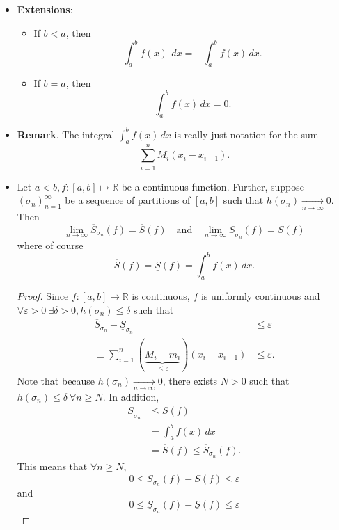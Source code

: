 \documentclass{article}
\newcommand{\R}{\mathbb{R}}
\newcommand{\?}{\stackrel{?}{=}}
\newcommand{\smallblacksquare}{\rule{0.5em}{0.5em}}
\theoremstyle{definition} %
\begin{document}
\begin{itemize}
    \item \textbf{Extensions}: 
    \begin{itemize}[label=\smallblacksquare]
        \item If $b < a$, then
    $$\int_a^b f(x) \ \, dx = -\int_a^b f(x) \, dx.$$
        \item If $b = a$, then
        $$\int_a^b f(x) \, dx = 0.$$
    \end{itemize}
    \item \textbf{Remark}. The integral $\int_a^b f(x) \, dx$ is really just notation for the sum
    $$\sum_{i = 1}^n M_i(x_i - x_{i - 1}).$$
    \item[]
    \begin{lemma}
        Let $a < b, f: [a, b] \mapsto \R$ be a continuous function. Further, suppose $(\sigma_n)_{n = 1}^\infty$ be a sequence of partitions of $[a, b]$ such that $h(\sigma_n) \underset{n \rightarrow \infty}{\longrightarrow} 0$. Then
        $$\lim_{n \to \infty}\overline{S}_{\sigma_n}(f) = \overline{S}(f) \quad \text{and} \quad \lim_{n \to \infty} \underline{S}_{\sigma_n}(f) = \underline{S}(f)$$
        where of course
        $$\overline{S}(f) = \underline{S}(f) = \int_a^b f(x) \, dx.$$
    \end{lemma}
    \begin{proof}
        Since $f: [a, b] \mapsto \R$ is continuous, $f$ is uniformly continuous and $\forall \varepsilon > 0 \ \exists \delta > 0, h(\sigma_n) \leq \delta$ such that
        \begin{align*}
            \overline{S}_{\sigma_n} - \underline{S}_{\sigma_n} &\leq \varepsilon \tag{*} \\
            \equiv \sum_{i = 1}^n (\underbrace{M_i - m_i}_{\leq \varepsilon})(x_i - x_{i - 1}) &\leq \varepsilon.
        \end{align*}
        Note that because $h(\sigma_n) \underset{n \rightarrow \infty}{\longrightarrow} 0$, there exists $N > 0$ such that $h(\sigma_n) \leq \delta \ \forall n \geq N$. In addition,
        \begin{align*}
            \underline{S}_{\sigma_n} &\leq \underline{S}(f) \\
            &= \int_a^b f(x) \, dx \\
            &= \overline{S}(f) \leq \overline{S}_{\sigma_n}(f).
        \end{align*}
        This means that $\forall n \geq N$,
        $$0 \leq \overline{S}_{\sigma_n}(f) - \overline{S}(f) \leq \varepsilon$$
        and
        $$0 \leq \underline{S}_{\sigma_n}(f) - \underline{S}(f) \leq \varepsilon$$

\end{proof}
\end{itemize}
\end{document}
